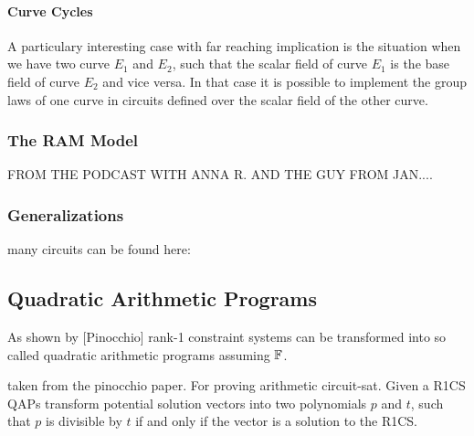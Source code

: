 

\paragraph{Curve Cycles} A particulary interesting case with far reaching implication is the situation when we have two curve $E_1$ and $E_2$, such that the scalar field of curve $E_1$ is the base field of curve $E_2$ and vice versa. In that case it is possible to implement the group laws of one curve in circuits defined over the scalar field of the other curve. 

\subsubsection{The RAM Model}
FROM THE PODCAST WITH ANNA R. AND THE GUY FROM JAN....


\subsubsection{Generalizations}
many circuits can be found here:

\subsection{Quadratic Arithmetic Programs}
As shown by [Pinocchio] rank-1 constraint systems can be transformed into so called quadratic  arithmetic  programs  assuming $\mathbb{F}$.

taken from the pinocchio paper. For proving arithmetic circuit-sat.  Given a R1CS QAPs transform potential solution vectors into two polynomials $p$ and $t$, such that $p$ is divisible by $t$ if and only if the vector is a solution to the R1CS. 

